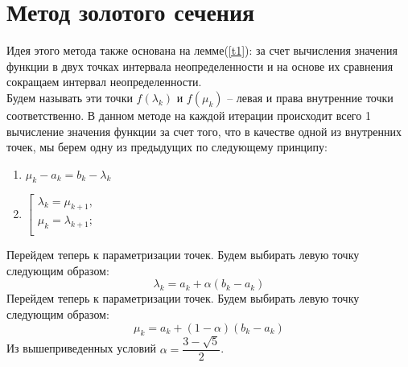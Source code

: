 \documentclass[12pt]{article}
\begin{document}
\section{Метод золотого сечения}
Идея этого метода также основана на лемме(\ref{t1}): за счет вычисления значения функции в двух точках интервала неопределенности и на основе их сравнения сокращаем интервал неопределенности.\\Будем называть эти точки $f(\lambda_k)$ и $f(\mu_k)$ – левая и права внутренние точки соответственно.
В данном методе на каждой итерации происходит всего 1 вычисление значения функции за счет того, что в качестве одной из внутренних точек, мы берем одну из предыдущих по следующему принципу:
\begin{enumerate}
    \item $\mu_k-a_k=b_k-\lambda_k $
    \item   $
                \left[ 
                  \begin{gathered} 
                    \lambda_k = \mu_{k+1}, \\ 
                    \mu_k = \lambda_{k+1}; \\ 
                  \end{gathered} 
                \right.
            $
\end{enumerate}
Перейдем теперь к параметризации точек. Будем выбирать левую точку следующим
образом:\\
$$
    \lambda_k = a_k +\alpha(b_k-a_k)
$$
Перейдем теперь к параметризации точек. Будем выбирать левую точку следующим
образом:\\
$$
    \mu_k = a_k +(1-\alpha)(b_k-a_k)
$$
Из вышеприведенных условий $\alpha = \dfrac{3-\sqrt{5}}{2}$.
\end{document}
